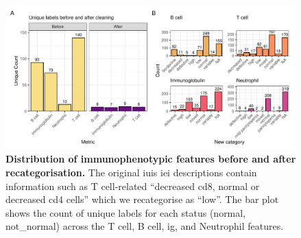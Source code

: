 \begin{figure}[ht]
  \centering
  \includegraphics[width=0.99\textwidth]{../images/plot_patch1.pdf}
  \caption{ \textbf{Distribution of immunophenotypic features before and after recategorisation.}
  The original \ac{iuis} \ac{iei} descriptions contain information such as T cell-related
  ``decreased cd8, normal or decreased cd4 cells'' which we recategorise as ``low''.
  The bar plot shows the count of unique labels for each status (normal, not\_normal) across the T cell, B cell, \ac{ig}, and Neutrophil features.}
  \label{fig:immunophenotype_before_after}
\end{figure}


